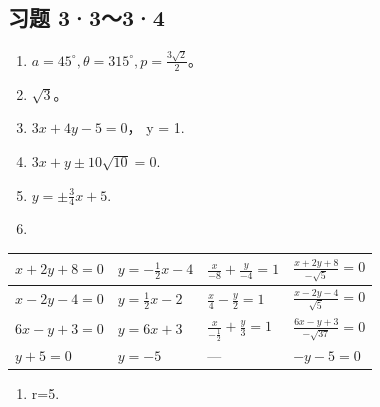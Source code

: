 \subsection{习题 3·3～3·4}\label{ux4e60ux9898-3334}

\begin{enumerate}
\def\labelenumi{\arabic{enumi}.}
\item
  \(a = 45^{\circ}, \theta = 315^{\circ}, p = \frac{3\sqrt{2}}{2}\)。
\item
  \(\sqrt{3}\)。
\item
  \(3x + 4y - 5 = 0\)， y = 1.
\item
  \(3x + y \pm 10\sqrt{10} = 0.\)
\item
  \(y = \pm \frac{3}{4} x + 5.\)
\item
\end{enumerate}

{\def\LTcaptype{none} %
\begin{longtable}[]{@{}
  >{\raggedright\arraybackslash}p{}
  >{\raggedright\arraybackslash}p{}
  >{\raggedright\arraybackslash}p{}
  >{\raggedright\arraybackslash}p{}@{}}
\toprule\noalign{}
\begin{minipage}[b]{\linewidth}\raggedright
\(x+2y+8=0\)
\end{minipage} & \begin{minipage}[b]{\linewidth}\raggedright
\(y=-\frac{1}{2}x-4\)
\end{minipage} & \begin{minipage}[b]{\linewidth}\raggedright
\(\frac{x}{-8}+\frac{y}{-4}=1\)
\end{minipage} & \begin{minipage}[b]{\linewidth}\raggedright
\(\frac{x+2y+8}{-\sqrt{5}}=0\)
\end{minipage} \\
\midrule\noalign{}
\endhead
\bottomrule\noalign{}
\endlastfoot
\(x-2y-4=0\) & \(y=\frac{1}{2}x-2\) & \(\frac{x}{4}-\frac{y}{2}=1\) &
\(\frac{x-2y-4}{\sqrt{5}}=0\) \\
\(6x-y+3=0\) & \(y=6x+3\) & \(\frac{x}{-\frac{1}{2}}+\frac{y}{3}=1\) &
\(\frac{6x-y+3}{-\sqrt{37}}=0\) \\
\(y+5=0\) & \(y=-5\) & --- & \(-y-5=0\) \\
\end{longtable}
}

\begin{enumerate}
\def\labelenumi{\arabic{enumi}.}
\setcounter{enumi}{8}
\tightlist
\item
  r=5.
\end{enumerate}


